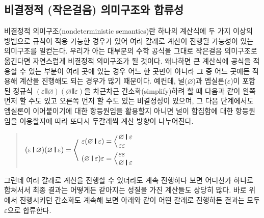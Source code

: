 \subsection{비결정적 (작은걸음) 의미구조와 합류성}
비결정적 의미구조(nondeterministic semantics)란 하나의 계산식에
두 가지 이상의 방법으로 규칙이 적용 가능한 경우가 있어 여러 갈래로
계산이 진행될 가능성이 있는 의미구조를 일컫는다. 우리가 아는
대부분의 수학 공식을 그대로 작은걸음 의미구조로 옮긴다면 자연스럽게
비결정적 의미구조가 될 것이다. 왜냐하면 큰 계산식에 공식을 적용할 수 있는
부분이 여러 곳에 있는 경우 어느 한 곳만이 아니라 그 중 어느 곳에든
적용해 계산을 진행해도 되는 경우가 많기 때문이다. 예컨데,
널($\varnothing$)과 엡실론($\varepsilon$)이 포함된 정규식
$(\varepsilon\VERT \varnothing)(\varnothing\VERT \varepsilon)$을
차근차근 간소화(simplify)하려 할 때 다음과 같이 왼쪽 먼저 할 수도 있고
오른쪽 먼저 할 수도 있는 비결정성이 있으며, 그 다음 단계에서도
엡실론이 이어붙이기에 대한 항등원임을 활용할지 아니면
널이 합집합에 대한 항등원임을 이용할지에 따라 또다시
두갈래씩 계산 방향이 나누어진다.
\begin{quote}
\(
(\varepsilon\VERT \varnothing)(\varnothing\VERT \varepsilon) =
\left<\phantom{\begin{array}{l}.\\[4ex].\end{array}}\hspace*{-4ex}\right.
\begin{array}{l}
  \varepsilon(\varnothing\VERT \varepsilon) =
     \Big<\hspace*{-1ex}
     \begin{array}{l}
       \varnothing\VERT \varepsilon \\
       \varepsilon\varepsilon
     \end{array}
  \\[1ex]
  (\varnothing\VERT \varepsilon)\varepsilon =
     \Big<\hspace*{-1ex}
     \begin{array}{l}
      \varepsilon\varepsilon  \\
      \varnothing\VERT \varepsilon
     \end{array}
\end{array}
\)
\end{quote}
그런데 여러 갈래로 계산을 진행할 수 있더라도 계속 진행하다 보면
어디선가 하나로 합쳐서서 최종 결과는 어떻게든 같아지는 성질을 가진
계산들도 상당히 많다. 바로 위에서 진행시키던 간소화도 계속해 보면
아래와 같이 어떤 갈래로 진행하든 결과는 모두 $\varepsilon$으로
합류한다.
